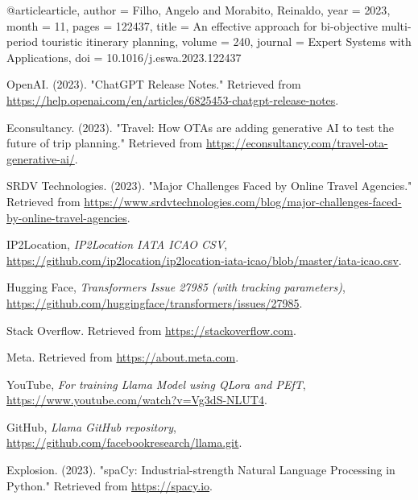 \documentclass[conference]{IEEEtran}
\begin{document}
\begin{thebibliography}{1}

        @article{article,
        author = {Filho, Angelo and Morabito, Reinaldo},
        year = {2023},
        month = {11},
        pages = {122437},
        title = {An effective approach for bi-objective multi-period touristic itinerary planning},
        volume = {240},
        journal = {Expert Systems with Applications},
        doi = {10.1016/j.eswa.2023.122437}
        }

        OpenAI. (2023). "ChatGPT Release Notes." Retrieved from \url{https://help.openai.com/en/articles/6825453-chatgpt-release-notes}.

        Econsultancy. (2023). "Travel: How OTAs are adding generative AI to test the future of trip planning." Retrieved from \url{https://econsultancy.com/travel-ota-generative-ai/}.

        SRDV Technologies. (2023). "Major Challenges Faced by Online Travel Agencies." Retrieved from \url{https://www.srdvtechnologies.com/blog/major-challenges-faced-by-online-travel-agencies}.

        IP2Location, \emph{IP2Location IATA ICAO CSV}, \href{https://github.com/ip2location/ip2location-iata-icao/blob/master/iata-icao.csv}{https://github.com/ip2location/ip2location-iata-icao/blob/master/iata-icao.csv}.

        Hugging Face, \emph{Transformers Issue 27985 (with tracking parameters)}, \href{https://github.com/huggingface/transformers/issues/27985}{https://github.com/huggingface/transformers/issues/27985}.

        Stack Overflow. Retrieved from \url{https://stackoverflow.com}.

        Meta. Retrieved from \url{https://about.meta.com}.

        YouTube, \emph{For training Llama Model using QLora and PEfT}, \href{https://www.youtube.com/watch?v=Vg3dS-NLUT4}{https://www.youtube.com/watch?v=Vg3dS-NLUT4}.

        GitHub, \emph{Llama GitHub repository}, \href{https://github.com/facebookresearch/llama.git}{https://github.com/facebookresearch/llama.git}.

        Explosion. (2023). "spaCy: Industrial-strength Natural Language Processing in Python." Retrieved from \url{https://spacy.io}.


\end{thebibliography}
\end{document}
